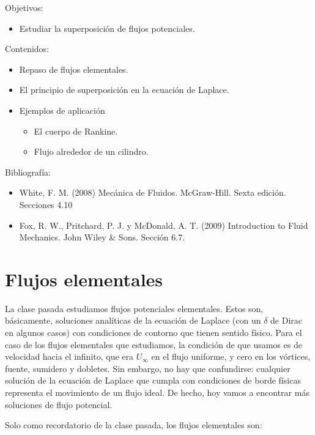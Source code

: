 \begin{framed}

Objetivos:
\begin{itemize}
    \item Estudiar la superposición de flujos potenciales. 
\end{itemize}

Contenidos:
\begin{itemize}
    \item Repaso de flujos elementales.
    \item El principio de superposición en la ecuación de Laplace. 
    \item Ejemplos de aplicación
    \begin{itemize}
        \item El cuerpo de Rankine. 
        \item Flujo alrededor de un cilindro. 
    \end{itemize}
\end{itemize}

Bibliografía:
\begin{itemize}
    \item White, F. M. (2008) Mecánica de Fluidos. McGraw-Hill. Sexta edición. Secciones 4.10
    \item Fox, R. W., Pritchard, P. J. y McDonald, A. T. (2009) Introduction to Fluid Mechanics. John Wiley \& Sons. Sección 6.7.
\end{itemize}
\end{framed}

\section*{Flujos elementales}

La clase pasada estudiamos flujos potenciales elementales.
Estos son, básicamente, soluciones analíticas de la ecuación de Laplace (con un $\delta$ de Dirac en algunos casos) con condiciones de contorno que tienen sentido físico.
Para el caso de los flujos elementales que estudiamos, la condición de que usamos es de velocidad hacia el infinito, que era $U_\infty$ en el flujo uniforme, y cero en los vórtices, fuente, sumidero y dobletes.
Sin embargo, no hay que confundirse: cualquier solución de la ecuación de Laplace que cumpla con condiciones de borde físicas representa el movimiento de un flujo ideal.
De hecho, hoy vamos a encontrar más soluciones de flujo potencial.

Solo como recordatorio de la clase pasada, los flujos elementales son:

